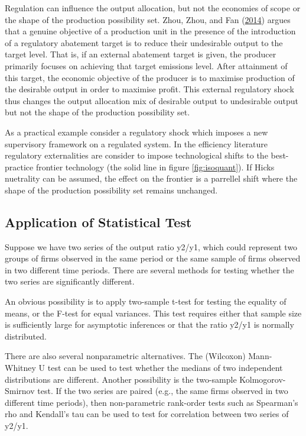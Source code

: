 \documentclass[12pt,]{article}
\begin{document}
Regulation can influence the output allocation, but not the economies of scope or the shape of the production possibility set. Zhou, Zhou, and Fan (\protect\hyperlink{ref-Zhou2014}{2014}) argues that a genuine objective of a production unit in the presence of the introduction of a regulatory abatement target is to reduce their undesirable output to the target level. That is, if an external abatement target is given, the producer primarily focuses on achieving that target emissions level. After attainment of this target, the economic objective of the producer is to maximise production of the desirable output in order to maximise profit. This external regulatory shock thus changes the output allocation mix of desirable output to undesirable output but not the shape of the production possibility set.

As a practical example consider a regulatory shock which imposes a new supervisory framework on a regulated system. In the efficiency literature regulatory externalities are consider to impose technological shifts to the best-practice frontier technology (the solid line in figure \ref{fig:isoquant}). If Hicks nuetrality can be assumed, the effect on the frontier is a parrellel shift where the shape of the production possibility set remains unchanged.

\hypertarget{application-of-statistical-test}{%
\subsection{Application of Statistical Test}\label{application-of-statistical-test}}

Suppose we have two series of the output ratio y2/y1, which could represent two groups of firms observed in the same period or the same sample of firms observed in two different time periods. There are several methods for testing whether the two series are significantly different.

An obvious possibility is to apply two-sample t-test for testing the equality of means, or the F-test for equal variances. This test requires either that sample size is sufficiently large for asymptotic inferences or that the ratio y2/y1 is normally distributed.

There are also several nonparametric alternatives. The (Wilcoxon) Mann-Whitney U test can be used to test whether the medians of two independent distributions are different. Another possibility is the two-sample Kolmogorov-Smirnov test. If the two series are paired (e.g., the same firms observed in two different time periods), then non-parametric rank-order tests such as Spearman's rho and Kendall's tau can be used to test for correlation between two series of y2/y1.
\end{document}
